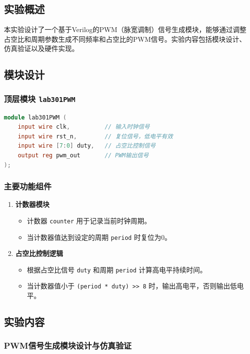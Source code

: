 \documentclass[12pt,hyperref,a4paper,UTF8]{ctexart}
\begin{document}
\subsection{实验概述}
本实验设计了一个基于Verilog的PWM（脉宽调制）信号生成模块，能够通过调整占空比和周期参数生成不同频率和占空比的PWM信号。实验内容包括模块设计、仿真验证以及硬件实现。

\subsection{模块设计}
\subsubsection{顶层模块 \texttt{lab301PWM}}
\begin{lstlisting}[language=Verilog]
module lab301PWM (
    input wire clk,          // 输入时钟信号
    input wire rst_n,        // 复位信号，低电平有效
    input wire [7:0] duty,   // 占空比控制信号
    output reg pwm_out       // PWM输出信号
);
\end{lstlisting}

\subsubsection{主要功能组件}
\begin{enumerate}
    \item \textbf{计数器模块}
    \begin{itemize}
        \item 计数器 \texttt{counter} 用于记录当前时钟周期。
        \item 当计数器值达到设定的周期 \texttt{period} 时复位为0。
    \end{itemize}
    
    \item \textbf{占空比控制逻辑}
    \begin{itemize}
        \item 根据占空比信号 \texttt{duty} 和周期 \texttt{period} 计算高电平持续时间。
        \item 当计数器值小于 \texttt{(period * duty) >> 8} 时，输出高电平，否则输出低电平。
    \end{itemize}
\end{enumerate}

\subsection{实验内容}
\subsubsection{PWM信号生成模块设计与仿真验证}
\end{document}
